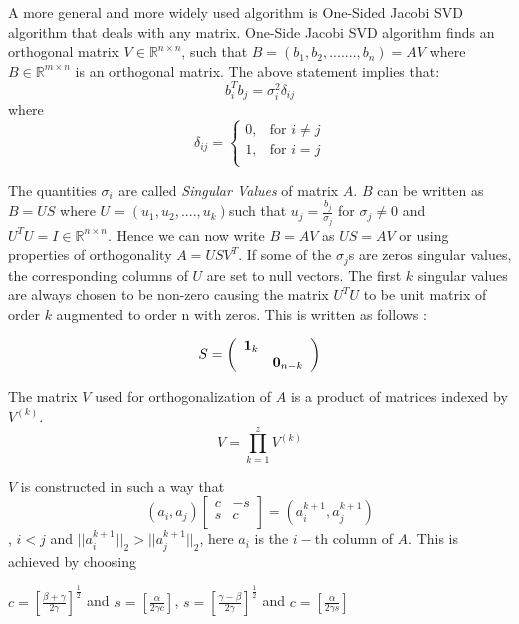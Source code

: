 \documentclass[10pt, conference, compsocconf]{IEEEtran}
\begin{document}
\par A more general and more widely used algorithm is One-Sided Jacobi SVD algorithm that deals with any matrix. One-Side Jacobi SVD algorithm finds an orthogonal matrix $V \in \mathbb{R}^{n \times n}$, such that $B = (b_1, b_2,.......,b_n) = AV$ where $B \in \mathbb{R}^{m \times n}$ is an orthogonal matrix. The above statement implies that:
\[
b_i^Tb_j = \sigma_i^2\delta_{ij}
\]
where
\[
\delta_{ij}= 
\begin{cases}
    0,& \text{for }i\neq j\\
    1,& \text{for }i = j\\
\end{cases}
\]

The quantities $\sigma_i$ are called \textit{Singular Values} of matrix $A$. $B$ can be written as $B = US$ where $U = (u_1, u_2,....,u_k)$such that $u_j = \frac{b_j}{\sigma_j}$ for $\sigma_j \neq 0$ and $U^TU = I \in \mathbb{R}^{n \times n}$. Hence we can now write $B = AV$ as $US = AV$ or using properties of orthogonality $A = USV^T$. If some of the $\sigma_j$s are zeros singular values, the corresponding columns of $U$ are set to null vectors. The first $k$ singular values are always chosen to be non-zero causing the matrix $U^TU$ to be unit matrix of order $k$ augmented to order n with zeros. This is written as follows :

\begin{equation}
S = \left( \begin{array}{cc}
\textbf{1}_k & \hfill\\
\hfill & \textbf{0}_{n-k}\\
\end{array} \right)
\end{equation} 

The matrix $V$ used for orthogonalization of $A$ is a product of matrices indexed by $V^{(k)}$.
\[
V = \prod_{k=1}^{z}V^{(k)}
\]

$V$ is constructed in such a way that
\begin{equation}
(a_i, a_j) \left[ \begin{array}{cc}
c & -s \\
s & c \\
\end{array} \right]
= (a_i^{k+1}, a_j^{k+1}) 
\end{equation}
, $i < j$ and $||a_i^{k+1}||_2 > ||a_j^{k+1}||_2$,
here $a_i$ is the $i-$th column of $A$. This is achieved by choosing 

$c = [\frac{\beta + \gamma}{2\gamma}]^{\frac{1}{2}}$ and $s = [\frac{\alpha}{2\gamma c}]$,
$s = [\frac{\gamma - \beta}{2\gamma}]^{\frac{1}{2}}$ and $c = [\frac{\alpha}{2\gamma s}]$
\end{document}
